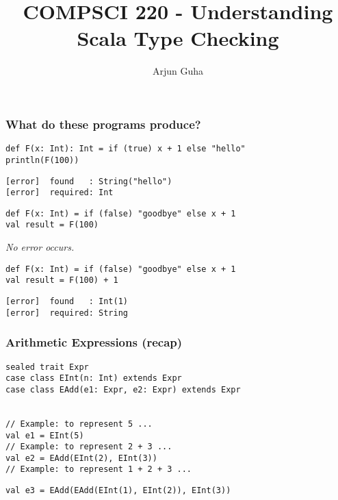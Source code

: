 \documentclass[8pt,pdf]{beamer}
\begin{document}

\title{COMPSCI 220 - Understanding Scala Type Checking}
\author{Arjun Guha}
\date{}

\begin{frame}
\titlepage
\end{frame}

\begin{frame}[fragile]
\frametitle{What do these programs produce?}

\begin{block}{}
\begin{lstlisting}
def F(x: Int): Int = if (true) x + 1 else "hello"
println(F(100))
\end{lstlisting}
\end{block}

\pause

\begin{lstlisting}
[error]  found   : String("hello")
[error]  required: Int
\end{lstlisting}

\pause

\begin{block}{}
\begin{lstlisting}
def F(x: Int) = if (false) "goodbye" else x + 1
val result = F(100)
\end{lstlisting}
\end{block}

\emph{No error occurs.}

\pause

\begin{block}{}
\begin{lstlisting}
def F(x: Int) = if (false) "goodbye" else x + 1
val result = F(100) + 1
\end{lstlisting}
\end{block}

\pause

\begin{lstlisting}
[error]  found   : Int(1)
[error]  required: String
\end{lstlisting}

\end{frame}

\begin{frame}[fragile]
\frametitle{Arithmetic Expressions (recap)}

\begin{lstlisting}
sealed trait Expr
case class EInt(n: Int) extends Expr
case class EAdd(e1: Expr, e2: Expr) extends Expr


// Example: to represent 5 ...
val e1 = EInt(5)
// Example: to represent 2 + 3 ...
val e2 = EAdd(EInt(2), EInt(3))
// Example: to represent 1 + 2 + 3 ...
\end{lstlisting}
\pause
\begin{lstlisting}
val e3 = EAdd(EAdd(EInt(1), EInt(2)), EInt(3))
\end{lstlisting}

\end{frame}
\end{document}
